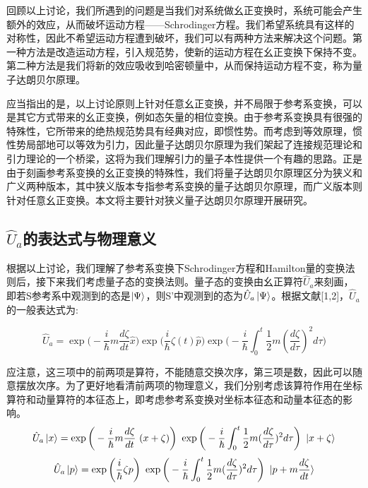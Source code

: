 \documentclass[a4paper]{article}
\begin{document}
        回顾以上讨论，我们所遇到的问题是当我们对系统做幺正变换时，系统可能会产生额外的效应，从而破坏运动方程——Schrodinger方程。我们希望系统具有这样的对称性，因此不希望运动方程遭到破坏，我们可以有两种方法来解决这个问题。第一种方法是改造运动方程，引入规范势，使新的运动方程在幺正变换下保持不变。第二种方法是我们将新的效应吸收到哈密顿量中，从而保持运动方程不变，称为量子达朗贝尔原理。

        应当指出的是，以上讨论原则上针对任意幺正变换，并不局限于参考系变换，可以是其它方式带来的幺正变换，例如态矢量的相位变换。由于参考系变换具有很强的特殊性，它所带来的绝热规范势具有经典对应，即惯性势。而考虑到等效原理，惯性势局部地可以等效为引力，因此量子达朗贝尔原理为我们架起了连接规范理论和引力理论的一个桥梁，这将为我们理解引力的量子本性提供一个有趣的思路。正是由于刻画参考系变换的幺正变换的特殊性，我们将量子达朗贝尔原理区分为狭义和广义两种版本，其中狭义版本专指参考系变换的量子达朗贝尔原理，而广义版本则针对任意幺正变换。本文将主要针对狭义量子达朗贝尔原理开展研究。

    \subsection{$\hat{U}_a$的表达式与物理意义}

        根据以上讨论，我们理解了参考系变换下Schrodinger方程和Hamilton量的变换法则后，接下来我们考虑量子态的变换法则。量子态的变换由幺正算符$\hat{U}_a$来刻画，即若S参考系中观测到的态是$\ket{\Psi}$，则S’中观测到的态为$\hat{U}_a\ket{\Psi}$。根据文献[1,2]，$\hat{U}_a$的一般表达式为:
    
        \begin{equation}
            \hat{U}_a=\exp\bigg(-\frac{i}{\hbar} m \frac{d \zeta}{dt} \hat{x}\bigg) \exp\bigg({\frac{i}{\hbar}\zeta(t) \hat{p}}\bigg) \exp\bigg(-\frac{i}{\hbar}\int_0^t\frac{1}{2}m(\frac{d \zeta}{d\tau})^2 d\tau\bigg)
        \end{equation}
        
        应注意，这三项中的前两项是算符，不能随意交换次序，第三项是数，因此可以随意摆放次序。为了更好地看清前两项的物理意义，我们分别考虑该算符作用在坐标算符和动量算符的本征态上，即考虑参考系变换对坐标本征态和动量本征态的影响。
        \begin{equation}
            \hat{U}_a \ket{x} = \exp\bigg(-\frac{i}{\hbar}m\frac{d \zeta}{dt}\ (x+\zeta)\bigg)\ \exp\bigg(-\frac{i}{\hbar}\int_0^t\frac{1}{2}m(\frac{d \zeta}{d\tau})^2 d\tau \bigg)\ \ket{x+\zeta}
        \end{equation}
        \begin{equation}
            \hat{U}_a \ket{p} = \exp\bigg(\frac{i}{\hbar}\zeta p \bigg)\ \exp\bigg(-\frac{i}{\hbar}\int_0^t\frac{1}{2}m(\frac{d \zeta}{d\tau})^2 d\tau \bigg)\ \ket{p+m\frac{d \zeta}{dt}}
        \end{equation}
\end{document}
